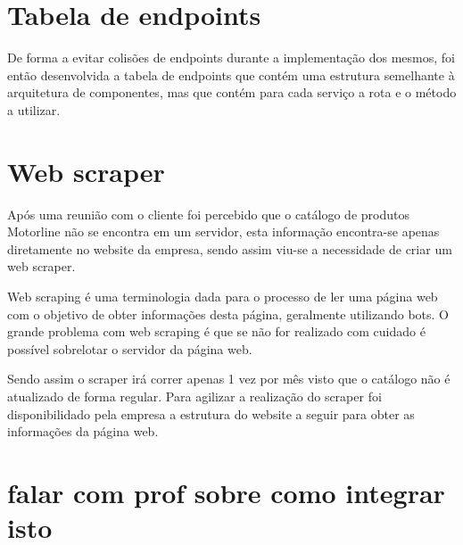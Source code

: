 \section{Tabela de endpoints}
De forma a evitar colisões de endpoints durante a implementação dos mesmos, foi então desenvolvida a 
tabela de endpoints que contém uma estrutura semelhante à arquitetura de componentes, mas que contém 
para cada serviço a rota e o método a utilizar.



\newpage

\section{Web scraper}

Após uma reunião com o cliente foi percebido que o catálogo de produtos Motorline não se encontra em um
servidor, esta informação encontra-se apenas diretamente no website da empresa, sendo assim viu-se a 
necessidade de criar um web scraper.

Web scraping é uma terminologia dada para o processo de ler uma página web com o objetivo de obter
informações desta página, geralmente utilizando bots. O grande problema com web scraping é que se não
for realizado com cuidado é possível sobrelotar o servidor da página web.

Sendo assim o scraper irá correr apenas 1 vez por mês visto que o catálogo não é atualizado de forma 
regular. Para agilizar a realização do scraper foi disponibilidado pela empresa a estrutura do website 
a seguir para obter as informações da página web.

\section{falar com prof sobre como integrar isto}